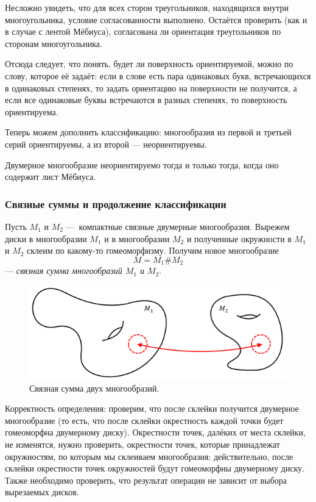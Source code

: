 Несложно увидеть, что для всех сторон треугольников, находящихся внутри многоугольника, условие согласованности выполнено. Остаётся проверить (как и в случае с лентой Мёбиуса), согласована ли ориентация треугольников по сторонам многоугольника.

Отсюда следует, что понять, будет ли поверхность ориентируемой, можно по слову, которое её задаёт: если в слове есть пара одинаковых букв, встречающихся в одинаковых степенях, то задать ориентацию на поверхности не получится, а если все одинаковые буквы встречаются в разных степенях, то поверхность ориентируема.

Теперь можем дополнить классификацию: многообразия из первой и третьей серий ориентируемы, а из второй — неориентируемы.

\begin{statement}
    Двумерное многообразие неориентируемо тогда и только тогда, когда оно содержит лист Мёбиуса.
\end{statement} 


\subsubsection{Связные суммы и продолжение классификации}
\begin{definition}
    Пусть $M_1$ и $M_2$ — компактные связные двумерные многообразия. Вырежем диски в многообразии $M_1$ и в многообразии $M_2$ и полученные окружности в $M_1$ и $M_2$ склеим по какому-то гомеоморфизму. Получим новое многообразие $$M = M_1 \# M_2$$ — \textit{связная сумма многообразий $M_1$ и $M_2$}.
\end{definition} 

\begin{figure}[ht]
    \centering
    \includegraphics[scale=0.8]{images/c11.9.png}
    \caption{Связная сумма двух многообразий.}
    \label{fig:c11.9}
\end{figure}

Корректность определения: проверим, что после склейки получится двумерное многообразие (то есть, что после склейки окрестность каждой точки будет гомеоморфна двумерному диску). Окрестности точек, далёких от места склейки, не изменятся, нужно проверить, окрестности точек, которые принадлежат окружностям, по которым мы склеиваем многообразия: действительно, после склейки окрестности точек окружностей будут гомеоморфны двумерному диску. Также необходимо проверить, что результат операции не зависит от выбора вырезаемых дисков.

